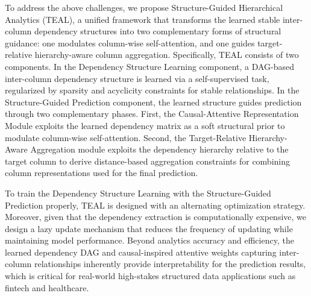\documentclass[conference]{IEEEtran}
\newcommand{\rl}[1]{{\color{black}#1}}
\newcommand{\vldb}[1]{{\color{black}#1}}
\newcommand{\zjic}[1]{{\color{black}#1}}
\newcommand{\syic}[1]{{\color{black}#1}}
\newcommand{\syone}[1]{{\color{black}#1}}
\newcommand*{\ourmodel}{TEAL}
\begin{document}
To address the above challenges, we propose \syic{Structure-Guided Hierarchical Analytics (\ourmodel{})}, \syic{a unified framework that transforms the learned stable inter-column dependency structures into two complementary forms of structural guidance: one modulates column-wise self-attention,
and one guides target-relative hierarchy-aware column aggregation. 
Specifically, \ourmodel{} consists of two components. 
In the Dependency Structure Learning component, a DAG-based inter-column dependency structure is learned via a self-supervised task, regularized by sparsity and acyclicity constraints \zjic{for stable relationships.} 
In the Structure-Guided Prediction component, 
the learned structure guides prediction through two complementary phases. 
First, \syone{the} Causal-Attentive Representation Module exploits the learned dependency matrix as a soft structural prior to modulate column-wise self-attention. 
Second, the Target-Relative Hierarchy-Aware Aggregation module 
exploits the dependency hierarchy relative to the target column to derive distance-based aggregation constraints for combining column representations used for the final prediction.}

\rl{To train the \syic{Dependency Structure Learning} with the \syic{Structure-Guided Prediction} properly, 
\ourmodel{} \vldb{is designed with} an alternating optimization strategy. }
\rl{
Moreover, given that the dependency extraction is computationally expensive, we design a lazy update mechanism that reduces the frequency of updating while maintaining model performance.
}
\vldb{
Beyond analytics accuracy and efficiency, the learned \syic{dependency} DAG and \syone{causal-inspired attentive} weights capturing inter-column relationships inherently provide interpretability for the prediction results, which is critical for real-world high-stakes structured data applications such as fintech and healthcare.
}
\end{document}
